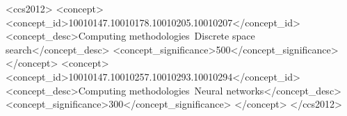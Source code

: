 \begin{CCSXML}
<ccs2012>
<concept>
<concept_id>10010147.10010178.10010205.10010207</concept_id>
<concept_desc>Computing methodologies~Discrete space search</concept_desc>
<concept_significance>500</concept_significance>
</concept>
<concept>
<concept_id>10010147.10010257.10010293.10010294</concept_id>
<concept_desc>Computing methodologies~Neural networks</concept_desc>
<concept_significance>300</concept_significance>
</concept>
</ccs2012>
\end{CCSXML}


